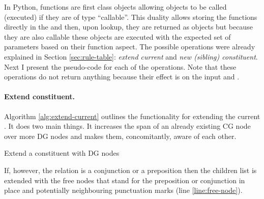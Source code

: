     In Python, functions are first class objects allowing objects to be called (executed) if they are of type ``callable''. This duality allows storing the functions directly in the \rt and then, upon lookup, they are returned as objects but because they are also callable these objects are executed with the expected set of parameters based on their function aspect. The possible operations were already explained in Section \ref{sec:rule-table}: \textit{extend current} and \textit{new (sibling) constituent}. Next I present the pseudo-code for each of the operations. Note that these operations do not return anything because their effect is on the input \cg and \dg. 

    \paragraph{Extend constituent.} Algorithm \ref{alg:extend-current} outlines the functionality for extending the current \cgPointer. It does two main things. It increases the span of an already existing CG node over more DG nodes and makes them, concomitantly, aware of each other. 

    \begin{algorithm}[!ht]
    \Input { \cgPointer, \Children, \elementType, \edge, \dg, \cg}
    	\caption{Extend a constituent with DG nodes}
    	\label{alg:extend-current}
    \end{algorithm}

    If, however, the \edge relation is a conjunction or a preposition then the children list is extended with the free nodes that stand for the preposition or conjunction in place and potentially neighbouring punctuation marks (line \ref{line:free-node}). %

